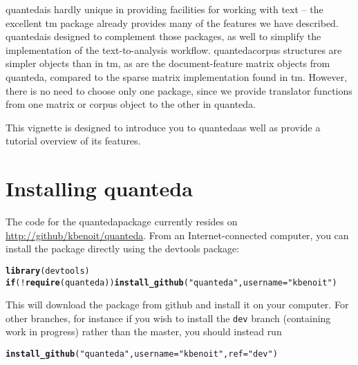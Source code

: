 \documentclass[11pt]{article}\usepackage[]{graphicx}\usepackage[]{color}
\makeatletter
\newcommand{\hlstr}[1]{\textcolor[rgb]{0.192,0.494,0.8}{#1}}%
\newcommand{\hlopt}[1]{\textcolor[rgb]{0,0,0}{#1}}%
\newcommand{\hlstd}[1]{\textcolor[rgb]{0.345,0.345,0.345}{#1}}%
\newcommand{\hlkwa}[1]{\textcolor[rgb]{0.161,0.373,0.58}{\textbf{#1}}}%
\newcommand{\hlkwc}[1]{\textcolor[rgb]{0.333,0.667,0.333}{#1}}%
\newcommand{\hlkwd}[1]{\textcolor[rgb]{0.737,0.353,0.396}{\textbf{#1}}}%
\newenvironment{kframe}{%
 \def\at@end@of@kframe{}%
 \ifinner\ifhmode%
  \def\at@end@of@kframe{\end{minipage}}%
  \begin{minipage}{\columnwidth}%
 \fi\fi%
 \def\FrameCommand##1{\hskip\@totalleftmargin \hskip-\fboxsep
 \colorbox{shadecolor}{##1}\hskip-\fboxsep
     \hskip-\linewidth \hskip-\@totalleftmargin \hskip\columnwidth}%
 \MakeFramed {\advance\hsize-\width
   \@totalleftmargin\z@ \linewidth\hsize
   \@setminipage}}%
 {\par\unskip\endMakeFramed%
 \at@end@of@kframe}
\newenvironment{knitrout}{}{} %
\newcommand{\quanteda}{\textsf{quanteda}}
\makeatother
\begin{document}
\quanteda is hardly unique in providing facilities for working with
text -- the excellent \textsf{tm} package already provides many of the
features we have described.  \quanteda is designed to complement those
packages, as well to simplify the implementation of the
text-to-analysis workflow.  \quanteda corpus structures are simpler
objects than in \textsf{tm}, as are the document-feature matrix
objects from \quanteda, compared to the sparse matrix implementation
found in \textsf{tm}.  However, there is no need to choose only one
package, since we provide translator functions from one matrix or
corpus object to the other in \quanteda.

This vignette is designed to introduce you to \quanteda as well as
provide a tutorial overview of its features.

\section{Installing \quanteda}

The code for the \quanteda package currently resides on
\url{http://github/kbenoit/quanteda}.  From an Internet-connected
computer, you can install the package directly using the
\textsf{devtools} package:

\begin{knitrout}\footnotesize
{}\color{fgcolor}\begin{kframe}
\begin{alltt}
\hlkwd{library}\hlstd{(devtools)}
\hlkwa{if} \hlstd{(}\hlopt{!}\hlkwd{require}\hlstd{(quanteda))} \hlkwd{install_github}\hlstd{(}\hlstr{"quanteda"}\hlstd{,} \hlkwc{username} \hlstd{=} \hlstr{"kbenoit"}\hlstd{)}
\end{alltt}
\end{kframe}
\end{knitrout}


This will download the package from github and install it on your computer.
For other branches, for instance if you wish to install the
\texttt{dev} branch (containing work in progress) rather than the
master, you should instead run

\begin{knitrout}\footnotesize
{}\color{fgcolor}\begin{kframe}
\begin{alltt}
\hlkwd{install_github}\hlstd{(}\hlstr{"quanteda"}\hlstd{,} \hlkwc{username} \hlstd{=} \hlstr{"kbenoit"}\hlstd{,} \hlkwc{ref} \hlstd{=} \hlstr{"dev"}\hlstd{)}
\end{alltt}
\end{kframe}
\end{knitrout}
\end{document}
